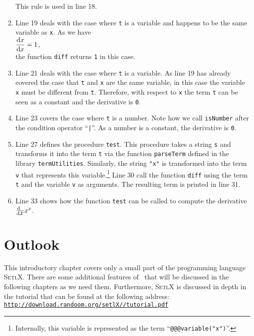 \begin{enumerate}
      This rule is used in line 18.
\item Line 19 deals with the case where \texttt{t} is a variable and happens to be the same variable as
      \texttt{x}.  As we have
      \\[0.2cm]
      \hspace*{1.3cm}
      $\displaystyle \frac{\mathrm{d}x}{\mathrm{d}x} = 1$,
      \\[0.2cm]
      the function \texttt{diff} returns \texttt{1} in this case.
\item Line 21 deals with the case where \texttt{t} is a variable.  As line 19 has already covered the case that
      \texttt{t} and \texttt{x} are the same variable, in this case the variable \texttt{x} must be different
      from \texttt{t}.  Therefore, with respect to \texttt{x} the term \texttt{t} can be seen as a constant and
      the derivative is \texttt{0}.
\item Line 23 covers the case where \texttt{t} is a number.  Note how we call \texttt{isNumber}
      after the condition operator ``\texttt{|}''.  As a number is a constant, the derivative is \texttt{0}.
\item Line 27 defines the procedure \texttt{test}.  This procedure takes a string \texttt{s} and transforms it
      into the term \texttt{t} via the function \texttt{parseTerm} defined in the library
      \texttt{termUtilities}.  Similarly, the string \texttt{"x"} is transformed into the term \texttt{v} that
      represents this variable.\footnote{Internally, this variable is represented as the term
      ``\texttt{@@@variable("x")}''.}
      Line 30 call the function \texttt{diff} using the term \texttt{t} and the variable \texttt{v}
      as arguments.  The resulting term is printed in line 31.
\item Line 33 shows how the function \texttt{test} can be called to compute the derivative $\frac{\textrm{d}\;\;}{\textrm{d}\mbox{$x$}} x^x$.
\end{enumerate}


\section{Outlook}
This introductory chapter covers only a small part of the programming language  \textsc{SetlX}.  There are some
additional features of \setlx\ that will be discussed in the following chapters as we need them.
Furthermore,  \textsc{SetlX} is discussed in depth in the tutorial that can be found at the following address:
\\[0.2cm]
\hspace*{1.3cm}
\href{http://download.randoom.org/setlX//tutorial.pdf}{\texttt{http://download.randoom.org/setlX//tutorial.pdf}}


